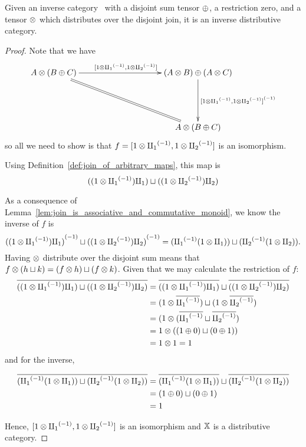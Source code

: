 \begin{lemma}
  Given an inverse category \X\ with a disjoint sum tensor $\oplus$, a restriction zero, and a tensor
  $\otimes$ which distributes over the disjoint join, it is an inverse distributive category.
\end{lemma}
\begin{proof}

  Note that we have
  \[
    \xymatrix @C=100pt @R=50pt{
      A \* (B \+ C) \ar[r]^{[1\* \icpa, 1\* \icpb]} \ar@{=}[dr]
      & (A\* B) \+ (A \* C) \ar[d]^{\inv{[1\* \icpa, 1\* \icpb]}} \\
      &A \* (B \+ C)
    }
  \]
  so all we need to show is that $f = [1\otimes {\amalg_{1}}^{(-1)}, 1\otimes {\amalg_{2}}^{(-1)}]$ is an isomorphism.

  Using Definition~\ref{def:join_of_arbitrary_maps}, this map is
  \[
    ((1 \otimes {\amalg_{1}}^{(-1)}) \amalg_{1} )\sqcup ((1\otimes{\amalg_{2}}^{(-1)}) \amalg_{2})
  \]

  As a consequence of Lemma~\ref{lem:join_is_associative_and_commutative_monoid}, we know
  the inverse of $f$ is
  \[
    {((1 \otimes {\amalg_{1}}^{(-1)}) \amalg_{1} )}^{(-1)}\sqcup {((1\otimes\ensuremath{{\amalg_{2}}^{(-1)}}) \amalg_{2})}^{(-1)} =
      ( {\amalg_{1}}^{(-1)}(1 \otimes \amalg_{1}) ) \sqcup ( {\amalg_{2}}^{(-1)}(1\otimes\amalg_{2})).
  \]
  Having $\otimes$ distribute over the disjoint sum means that
  $f \otimes (h\sqcup k) = (f\otimes h) \sqcup (f\otimes k)$. Given that we may calculate the restriction of $f$:
  \begin{align*}
    \overline{((1 \otimes {\amalg_{1}}^{(-1)}) \amalg_{1} )\sqcup ((1\otimes{\amalg_{2}}^{(-1)}) \amalg_{2})}
      &= \overline{((1 \otimes {\amalg_{1}}^{(-1)}) \amalg_{1} )}\sqcup \overline{((1\otimes{\amalg_{2}}^{(-1)}) \amalg_{2})} \\
      &= (1\otimes \overline{{\amalg_{1}}^{(-1)}}) \sqcup (1\otimes \overline{{\amalg_{2}}^{(-1)}}) \\
      &= (1\otimes (\overline{{\amalg_{1}}^{(-1)}} \sqcup \overline{{\amalg_{2}}^{(-1)}}) \\
      &= 1\otimes ((1\oplus0) \sqcup (0\oplus1) )\\
      &=1 \otimes 1 = 1
  \end{align*}
  and for the inverse,

  \begin{align*}
    \overline{( {\amalg_{1}}^{(-1)}(1 \otimes \amalg_{1}) ) \sqcup ( {\amalg_{2}}^{(-1)}(1\otimes\amalg_{2}))}
      &= \overline{({\amalg_{1}}^{(-1)}(1 \otimes \amalg_{1}) )}\sqcup \overline{({\amalg_{2}}^{(-1)}(1\otimes\amalg_{2}))} \\
      &= (1\oplus0) \sqcup (0\oplus1) \\
      &= 1
  \end{align*}

  Hence, $[1\otimes {\amalg_{1}}^{(-1)}, 1\otimes {\amalg_{2}}^{(-1)}]$ is an isomorphism and $\mathbb{X}$ is a distributive category.
\end{proof}

